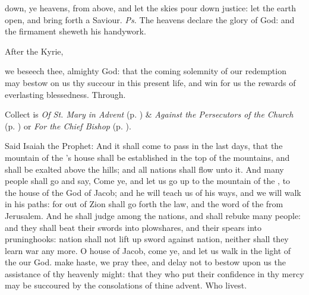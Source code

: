 \properantiphonfix

\introit
{} down, ye heavens, from above, and let the skies pour down justice: let the earth open, and bring forth a Saviour. \textit{Ps.} The heavens declare the glory of God: and the firmament sheweth his handywork.
\begin{rubric}
    After the Kyrie,
\end{rubric}
\collect
{} we beseech thee, almighty God: that the coming solemnity of our redemption may bestow on us thy succour in this present life, and win for us the rewards of everlasting blessedness. Through.
\begin{rubric}
     Collect is \emph{Of St. Mary in Advent} (p. \pageref{SPMaryInAdvent}) \&  \emph{Against the Persecutors of the Church} (p. \pageref{SPAgainst}) or \emph{For the Chief Bishop} (p. \pageref{SPChiefBishop}).
\end{rubric}
 Said Isaiah the Prophet: And it shall come to pass in the last days, that the mountain of the 's house shall be established in the top of the mountains, and shall be exalted above the hills; and all nations shall flow unto it. And many people shall go and say, Come ye, and let us go up to the mountain of the , to the house of the God of Jacob; and he will teach us of his ways, and we will walk in his paths: for out of Zion shall go forth the law, and the word of the  from Jerusalem. And he shall judge among the nations, and shall rebuke many people: and they shall beat their swords into plowshares, and their spears into pruninghooks: nation shall not lift up sword against nation, neither shall they learn war any more. O house of Jacob, come ye, and let us walk in the light of the  our God. %
\collect
{} make haste, we pray thee, and delay not to bestow upon us the assistance of thy heavenly might: that they who put their confidence in thy mercy may be succoured by the consolations of thine advent. Who livest.


